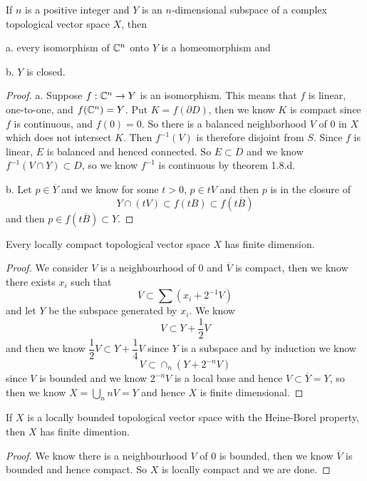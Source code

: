\begin{theorem}
    If $n$ is a positive integer and $Y$ is an $n$-dimensional subspace of a complex topological vector space $X$, then\par
    a. every isomorphism of $\mathbb{C}^n$ onto $Y$ is a homeomorphism and\par
    b. $Y$ is closed.
\end{theorem}
\begin{proof}
    a. Suppose $f:\mathbb{C}^n \to Y$ is an isomorphism. This means that $f$ is linear, one-to-one, and $f(\mathbb{C}^n) = Y$. Put $K = f(\partial D)$, then we know $K$ is compact since $f$ is continuous, and $f(0) = 0$. So there is a balanced neighborhood $V$ of $0$ in $X$ which does not intersect $K$. Then $f^{-1}(V)$ is therefore disjoint from $S$. Since $f$ is linear, $E$ is balanced and henced connected. So $E\subset D$ and we know $f^{-1}(V\cap Y) \subset D$, so we know $f^{-1}$ is continuous by theorem 1.8.d. \par
    b. Let $p\in \overline{Y}$ and we know for some $t>0$, $p\in tV$ and then $p$ is in the closure of
    \[
    Y\cap (tV) \subset f(tB) \subset f(t\overline{B})
    \]
    and then $p\in f(t\overline{B}) \subset Y$.
\end{proof}

\begin{theorem}
    Every locally compact topological vector space $X$ has finite dimension.
\end{theorem}
\begin{proof}
    We consider $V$ is a neighbourhood of $0$ and $\overline{V}$ is compact, then we know there exists $x_i$ such that
    \[
    \overline{V} \subset \sum (x_i+2^{-1}V)
    \]
    and let $Y$ be the subspace generated by $x_i$. We know
    \[V \subset Y + \dfrac{1}{2}V\]
    and then we know $\dfrac{1}{2}V\subset Y + \dfrac{1}{4}V$ since $Y$ is a subspace and by induction we know
    \[
    V\subset \cap_{n} (Y+2^{-n} V)
    \]
    since $V$ is bounded and we know $2^{-n} V$ is a local base and hence $V\subset \overline{Y} = Y$, so then we know $X = \bigcup_{n} nV = Y$ and hence $X$ is finite dimensional.
\end{proof}

\begin{theorem}
    If $X$ is a locally bounded topological vector space with the Heine-Borel property, then $X$ has finite dimention.
\end{theorem}
\begin{proof}
    We know there is a neighbourhood $V$ of $0$ is bounded, then we know $\overline{V}$ is bounded and hence compact. So $X$ is locally compact and we are done.
\end{proof}

